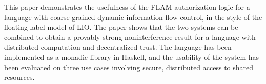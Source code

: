 This paper demonstrates the usefulness of the FLAM authorization logic for a language with coarse-grained dynamic information-flow control, in the style of the floating label model of LIO. The paper shows that the two systems can be combined to obtain a provably strong noninterference result for a language with distributed computation and decentralized trust. The language has been implemented as a monadic library in Haskell, and the usability of the system has been evaluated on three use cases involving secure, distributed access to shared resources.